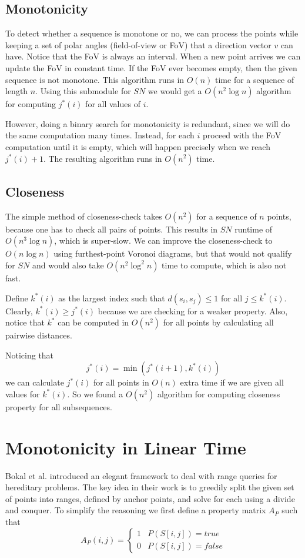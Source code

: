 \documentclass{article}
\newcommand{\twopartdef}[4]
{
    \left\{
    \begin{array}{ll}
        #1 & #2 \\
        #3 & #4
    \end{array}
    \right.
}
\begin{document}
\subsection{Monotonicity}
\label{sec:naive:monotonicity}
To detect whether a sequence is monotone or no, we can process the points while keeping a set of polar angles (field-of-view or FoV) that a direction vector $v$ can have. Notice that the FoV is always an interval. When a new point arrives we can update the FoV in constant time. If the FoV ever becomes empty, then the given sequence is not monotone. This algorithm runs in $O(n)$ time for a sequence of length $n$. Using this submodule for $SN$ we would get a $O(n^2\log n)$ algorithm for computing $j^*(i)$ for all values of $i$.

However, doing a binary search for monotonicity is redundant, since we will do the same computation many times. Instead, for each $i$ proceed with the FoV computation until it is empty, which will happen precisely when we reach $j^*(i) + 1$. The resulting algorithm runs in $O(n^2)$ time.

\subsection{Closeness}
\label{sec:naive:closeness}
The simple method of closeness-check takes $O(n^2)$ for a sequence of $n$ points, because one has to check all pairs of points. This results in $SN$ runtime of $O(n^3\log n)$, which is super-slow. We can improve the closeness-check to $O(n\log n)$ using furthest-point Voronoi diagrams, but that would not qualify for $SN$ and would also take $O(n^2 \log^2 n)$ time to compute, which is also not fast.

Define $k^*(i)$ as the largest index such that $d(s_i, s_j) \leq
1$ for all $j \leq k^*(i)$. Clearly, $k^*(i) \geq j^*(i)$ because we are checking for a weaker property. Also,
notice that $k^*$ can be computed in $O(n^2)$ for all points by calculating all pairwise distances.

Noticing that 
\begin{equation}
\label{kj_rel}
j^*(i) = \min( j^*(i + 1), k^*(i) )
\end{equation}
we can calculate
$j^*(i)$ for all points in $O(n)$ extra time if we are given all
values for $k^*(i)$. So we found a $O(n^2)$ algorithm for computing
closeness property for all subsequences.

\section{Monotonicity in Linear Time}
\label{sec:monotonicity}
Bokal et al. introduced an elegant framework to deal with range queries for hereditary problems. The key idea in their work is to greedily split the given set of points into ranges, defined by anchor points, and solve for each using a divide and conquer. To simplify the reasoning we first define a property matrix $A_P$ such that
\[ A_P(i, j) = \twopartdef{1}{P(S[i, j]) = true}{0}{P(S[i, j]) = false} \]
\end{document}
